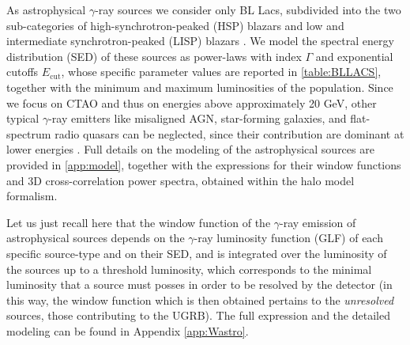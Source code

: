 \documentclass[aps,prd,a4paper,reprint,nofootinbib,superscriptaddress,floatfix,preprintnumbers]{revtex4-2}
\let\Gamma\varGamma
\begin{document}
As astrophysical $\gamma$-ray sources we consider only BL Lacs, subdivided into the two sub-categories of high-synchrotron-peaked (HSP) blazars and low and intermediate synchrotron-peaked (LISP) blazars \cite{DiMauro:2013zfa}.
We model the spectral energy distribution (SED) of these sources as power-laws with index $\Gamma$ and exponential cutoffs $E_\textrm{cut}$, whose specific parameter values are reported in \cref{table:BLLACS}, together with the minimum and maximum luminosities of the population.
Since we focus on CTAO and thus on energies above approximately {20} GeV, 
other typical $\gamma$-ray emitters like misaligned AGN, star-forming galaxies, and flat-spectrum radio quasars can be neglected, since their contribution are dominant at lower energies \cite{DGRB-review}. Full details on the modeling of the astrophysical sources are provided in {\cref{app:model}}, together with the expressions for their window functions and 3D cross-correlation power spectra, obtained within the halo model formalism.

Let us just recall here that the window function of the $\gamma$-ray emission of astrophysical sources depends on the $\gamma$-ray luminosity function (GLF) of each specific source-type and on their SED, and is integrated over the luminosity of the sources up to a threshold luminosity, which corresponds to the minimal luminosity that a source must posses in order to be resolved by the detector (in this way, the window function which is then obtained pertains to the \textit{unresolved} sources, those contributing to the UGRB). The full expression and the detailed modeling can be found in Appendix \ref{app:Wastro}.
\end{document}
